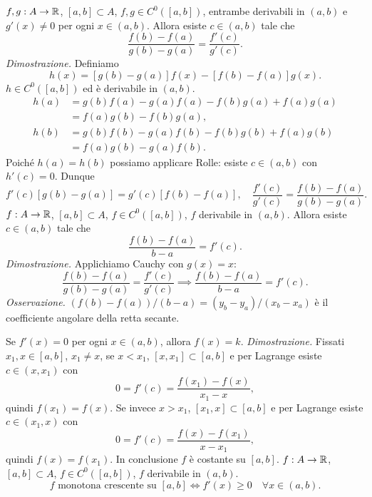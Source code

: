 $f,g:A\to\mathbb R$, $[a,b]\subset A$, $f,g\in C^0([a,b])$, entrambe derivabili in $(a,b)$ e $g'(x)\ne0$ per ogni $x\in(a,b)$.
Allora esiste $c\in(a,b)$ tale che
\[\frac{f(b)-f(a)}{g(b)-g(a)}=\frac{f'(c)}{g'(c)}.\]
\textit{Dimostrazione.} Definiamo
\[h(x)=[g(b)-g(a)]f(x)-[f(b)-f(a)]g(x).\]
$h\in C^0([a,b])$ ed è derivabile in $(a,b)$.
\begin{align*}
h(a)&=g(b)f(a)-g(a)f(a)-f(b)g(a)+f(a)g(a)\\&=f(a)g(b)-f(b)g(a),\\
h(b)&=g(b)f(b)-g(a)f(b)-f(b)g(b)+f(a)g(b)\\&=f(a)g(b)-g(a)f(b).
\end{align*}
Poiché $h(a)=h(b)$ possiamo applicare Rolle: esiste $c\in(a,b)$ con $h'(c)=0$.
Dunque
\[f'(c)[g(b)-g(a)]=g'(c)[f(b)-f(a)],\quad\frac{f'(c)}{g'(c)}=\frac{f(b)-f(a)}{g(b)-g(a)}.\]
$f:A\to\mathbb R$, $[a,b]\subset A$, $f\in C^0([a,b])$, $f$ derivabile in $(a,b)$.
Allora esiste $c\in(a,b)$ tale che
\[\frac{f(b)-f(a)}{b-a}=f'(c).\]
\textit{Dimostrazione.} Applichiamo Cauchy con $g(x)=x$:
\[\frac{f(b)-f(a)}{g(b)-g(a)}=\frac{f'(c)}{g'(c)}\implies\frac{f(b)-f(a)}{b-a}=f'(c).\]
\textit{Osservazione.} $(f(b)-f(a))/(b-a)=(y_b-y_a)/(x_b-x_a)$ è il coefficiente angolare della retta secante.
\begin{center}\end{center}
Se $f'(x)=0$ per ogni $x\in(a,b)$, allora $f(x)=k$.
\textit{Dimostrazione.} Fissati $x_1,x\in[a,b]$, $x_1\ne x$, se $x<x_1$, $[x,x_1]\subset[a,b]$ e per Lagrange esiste $c\in(x,x_1)$ con
\[0=f'(c)=\frac{f(x_1)-f(x)}{x_1-x},\]
quindi $f(x_1)=f(x)$.
Se invece $x>x_1$, $[x_1,x]\subset[a,b]$ e per Lagrange esiste $c\in(x_1,x)$ con
\[0=f'(c)=\frac{f(x)-f(x_1)}{x-x_1},\]
quindi $f(x)=f(x_1)$. In conclusione $f$ è costante su $[a,b]$.
$f:A\to\mathbb R$, $[a,b]\subset A$, $f\in C^0([a,b])$, $f$ derivabile in $(a,b)$.
\[f\text{ monotona crescente su }[a,b]\iff f'(x)\ge0\quad\forall x\in(a,b).\]
